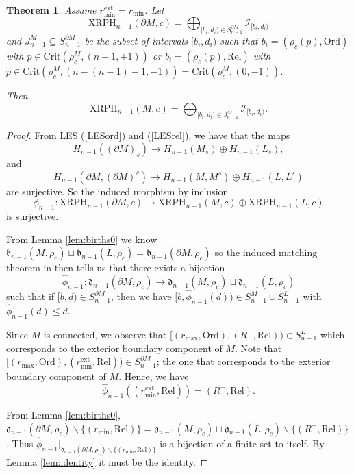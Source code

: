 \documentclass[a4paper,11pt]{article}
\newtheorem{theorem}{Theorem}[section]
\theoremstyle{definition}
\newcommand{\death}{\mathfrak{d}}
\begin{document}
\begin{theorem}\label{r_min=r_min^ext} 
Assume $r_{\min}^\mathrm{ext}=r_{\min}$. 
Let $$\text{XRPH}_{n-1}(\partial M, c) = \bigoplus_{[b_i,d_i)\in S_{n-1}^{\partial M}} \mathcal{I}_{[b_i,d_i)}$$ and $J_{n-1}^M\subseteq S_{n-1}^{\partial M}$ be the subset of intervals $[b_i,d_i)$ such that $b_i = (\rho_c(p),\text{Ord})$ with $p\in\text{Crit}(\rho_c^M,(n-1,+1))$ or $b_i = (\rho_c(p),\text{Rel})$ with $p\in\text{Crit}(\rho_c^M,(n-(n-1)-1,-1))=\text{Crit}(\rho_c^M,(0,-1))$. 

Then $$\text{XRPH}_{n-1}(M, c) = \bigoplus_{[b_i,d_i)\in J_{n-1}^{M}} \mathcal{I}_{[b_i,d_i)}.$$
\end{theorem}

\begin{proof}

From LES (\ref{LESord}) and (\ref{LESrel}), we have that the maps
$$H_{n-1}((\partial M)_s)\to H_{n-1}(M_s)\oplus H_{n-1}(L_s),$$ and 
$$H_{n-1}(\partial M,(\partial M)^s)\to  H_{n-1}(M,M^s)\oplus H_{n-1}(L,L^s)$$ are surjective. So the induced morphism by inclusion
$$\phi_{n-1}: \text{XRPH}_{n-1}(\partial M,c) \to\text{XRPH}_{n-1}(M,c) \oplus \text{XRPH}_{n-1}(L,c)$$ is surjective.

From Lemma \ref{lem:births0} we know $\mathfrak{b}_{n-1}(M,\rho_c)\sqcup  \mathfrak{b}_{n-1}(L,\rho_c)= \mathfrak{b}_{n-1}(\partial M,\rho_c)$ so 
the induced matching theorem in \cite{matching} then tells us that there exists a bijection 
$$\hat{\phi}_{n-1}: \death_{n-1}(\partial M, \rho_c) \to \death_{n-1}(M, \rho_c)  \sqcup \death_{n-1}(L, \rho_c)$$ 
such that if $[b,d)\in S_{n-1}^{\partial M}$, then we have
$[b,\hat{\phi}_{n-1}(d))\in S_{n-1}^{M}\cup S_{n-1}^{L}$ with $\hat{\phi}_{n-1}(d)\leq d$.

Since $M$ is connected, we observe that $[(r_{\max},\text{Ord}),(R^-,\text{Rel}))\in S_{n-1}^{L}$ which corresponds to the exterior boundary component of $M$. Note that $[(r_{\max},\text{Ord}),(r_{\min}^\mathrm{ext},\text{Rel}))\in S_{n-1}^{\partial M}$; the one that corresponds to the exterior boundary component of $M$. Hence, we have $$\hat{\phi}_{n-1}((r_{\min}^\mathrm{ext},\text{Rel}))=(R^-,\text{Rel}).$$ 


From Lemma \ref{lem:births0}, $\mathfrak{d}_{n-1}(\partial M,\rho_c)\backslash \{(r_{\min},\text{Rel})\} =\mathfrak{d}_{n-1}(M,\rho_c)\sqcup  \mathfrak{d}_{n-1}(L,\rho_c)\backslash \{(R^-,\text{Rel})\}$. Thus $\hat{\phi}_{n-1}|_{\mathfrak{d}_{n-1}(\partial M,\rho_c)\backslash \{(r_{\min},\text{Rel})\}}$ is a bijection of a finite set to itself. By Lemma \ref{lem:identity} it must be the identity.




\end{proof}
\end{document}
